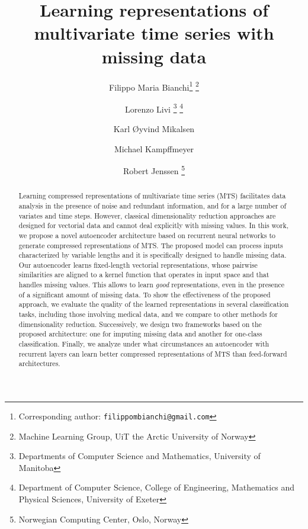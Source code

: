 \documentclass[a4paper,10pt,pdftex]{article}
\newcommand{\footremember}[2]{\footnote{#2}
    \newcounter{#1}
    \setcounter{#1}{\value{footnote}}}
\newcommand{\footrecall}[1]{\footnotemark[\value{#1}]}
\begin{document}
\title{Learning representations of multivariate time series with missing data}



\author{Filippo Maria Bianchi\footremember{corr}{Corresponding author: \texttt{filippombianchi@gmail.com}}\footremember{uit}{Machine Learning Group, UiT the Arctic University of Norway}\and Lorenzo Livi \footremember{man}{Departments of Computer Science and Mathematics, University of Manitoba} \footremember{ext}{Department of Computer Science, College of Engineering, Mathematics and Physical Sciences, University of Exeter}\and Karl {\O}yvind Mikalsen\footrecall{uit}\and Michael Kampffmeyer\footrecall{uit}\and Robert Jenssen \footrecall{uit} \footremember{nrs}{Norwegian Computing Center, Oslo, Norway}
}
\date{}

\maketitle

\begin{abstract} 
Learning compressed representations of multivariate time series (MTS) facilitates data analysis in the presence of noise and redundant information, and for a large number of variates and time steps.
However, classical dimensionality reduction approaches are designed for vectorial data and cannot deal explicitly with missing values.
In this work, we propose a novel autoencoder architecture based on recurrent neural networks to generate compressed representations of MTS.
The proposed model can process inputs characterized by variable lengths and it is specifically designed to handle missing data.
Our autoencoder learns fixed-length vectorial representations, whose pairwise similarities are aligned to a kernel function that operates in input space and that handles missing values.
This allows to learn \textit{good} representations, even in the presence of a significant amount of missing data.
To show the effectiveness of the proposed approach, we evaluate the quality of the learned representations in several classification tasks, including those involving medical data, and we compare to other methods for dimensionality reduction.
Successively, we design two frameworks based on the proposed architecture: one for imputing missing data and another for one-class classification.
Finally, we analyze under what circumstances an autoencoder with recurrent layers can learn better compressed representations of MTS than feed-forward architectures.
\end{abstract}
\end{document}
